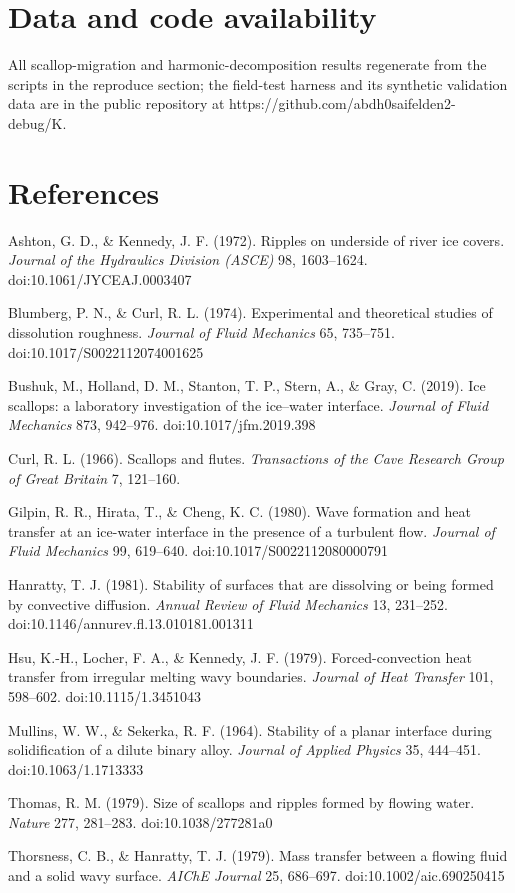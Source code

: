 \documentclass{jfm}
\begin{document}
\section*{Data and code availability}


All scallop-migration and harmonic-decomposition results regenerate from the scripts in the reproduce section; the field-test harness and its synthetic validation data are in the public repository at https://github.com/abdh0saifelden2-debug/K.


\section*{References}


Ashton, G. D., \& Kennedy, J. F. (1972). Ripples on underside of river ice covers. \emph{Journal of the Hydraulics Division (ASCE)} 98, 1603–1624. doi:10.1061/JYCEAJ.0003407


Blumberg, P. N., \& Curl, R. L. (1974). Experimental and theoretical studies of dissolution roughness. \emph{Journal of Fluid Mechanics} 65, 735–751. doi:10.1017/S0022112074001625


Bushuk, M., Holland, D. M., Stanton, T. P., Stern, A., \& Gray, C. (2019). Ice scallops: a laboratory investigation of the ice–water interface. \emph{Journal of Fluid Mechanics} 873, 942–976. doi:10.1017/jfm.2019.398


Curl, R. L. (1966). Scallops and flutes. \emph{Transactions of the Cave Research Group of Great Britain} 7, 121–160.


Gilpin, R. R., Hirata, T., \& Cheng, K. C. (1980). Wave formation and heat transfer at an ice-water interface in the presence of a turbulent flow. \emph{Journal of Fluid Mechanics} 99, 619–640. doi:10.1017/S0022112080000791


Hanratty, T. J. (1981). Stability of surfaces that are dissolving or being formed by convective diffusion. \emph{Annual Review of Fluid Mechanics} 13, 231–252. doi:10.1146/annurev.fl.13.010181.001311


Hsu, K.-H., Locher, F. A., \& Kennedy, J. F. (1979). Forced-convection heat transfer from irregular melting wavy boundaries. \emph{Journal of Heat Transfer} 101, 598–602. doi:10.1115/1.3451043


Mullins, W. W., \& Sekerka, R. F. (1964). Stability of a planar interface during solidification of a dilute binary alloy. \emph{Journal of Applied Physics} 35, 444–451. doi:10.1063/1.1713333


Thomas, R. M. (1979). Size of scallops and ripples formed by flowing water. \emph{Nature} 277, 281–283. doi:10.1038/277281a0


Thorsness, C. B., \& Hanratty, T. J. (1979). Mass transfer between a flowing fluid and a solid wavy surface. \emph{AIChE Journal} 25, 686–697. doi:10.1002/aic.690250415
\end{document}
